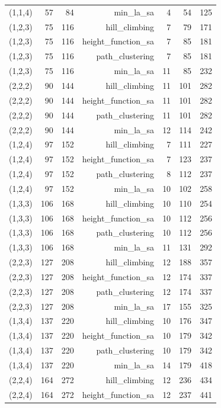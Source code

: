 \begin{longtable}{lrrrrrr}
  (1,1,4) & 57 & 84 & min\_la\_sa & 4 & 54 & 125 \\
  (1,2,3) & 75 & 116 & hill\_climbing & 7 & 79 & 171 \\
  (1,2,3) & 75 & 116 & height\_function\_sa & 7 & 85 & 181 \\
  (1,2,3) & 75 & 116 & path\_clustering & 7 & 85 & 181 \\
  (1,2,3) & 75 & 116 & min\_la\_sa & 11 & 85 & 232 \\
  (2,2,2) & 90 & 144 & hill\_climbing & 11 & 101 & 282 \\
  (2,2,2) & 90 & 144 & height\_function\_sa & 11 & 101 & 282 \\
  (2,2,2) & 90 & 144 & path\_clustering & 11 & 101 & 282 \\
  (2,2,2) & 90 & 144 & min\_la\_sa & 12 & 114 & 242 \\
  (1,2,4) & 97 & 152 & hill\_climbing & 7 & 111 & 227 \\
  (1,2,4) & 97 & 152 & height\_function\_sa & 7 & 123 & 237 \\
  (1,2,4) & 97 & 152 & path\_clustering & 8 & 112 & 237 \\
  (1,2,4) & 97 & 152 & min\_la\_sa & 10 & 102 & 258 \\
  (1,3,3) & 106 & 168 & hill\_climbing & 10 & 110 & 254 \\
  (1,3,3) & 106 & 168 & height\_function\_sa & 10 & 112 & 256 \\
  (1,3,3) & 106 & 168 & path\_clustering & 10 & 112 & 256 \\
  (1,3,3) & 106 & 168 & min\_la\_sa & 11 & 131 & 292 \\
  (2,2,3) & 127 & 208 & hill\_climbing & 12 & 188 & 357 \\
  (2,2,3) & 127 & 208 & height\_function\_sa & 12 & 174 & 337 \\
  (2,2,3) & 127 & 208 & path\_clustering & 12 & 174 & 337 \\
  (2,2,3) & 127 & 208 & min\_la\_sa & 17 & 155 & 325 \\
  (1,3,4) & 137 & 220 & hill\_climbing & 10 & 176 & 347 \\
  (1,3,4) & 137 & 220 & height\_function\_sa & 10 & 179 & 342 \\
  (1,3,4) & 137 & 220 & path\_clustering & 10 & 179 & 342 \\
  (1,3,4) & 137 & 220 & min\_la\_sa & 14 & 179 & 418 \\
  (2,2,4) & 164 & 272 & hill\_climbing & 12 & 236 & 434 \\
  (2,2,4) & 164 & 272 & height\_function\_sa & 12 & 237 & 441 \\

\end{longtable}
